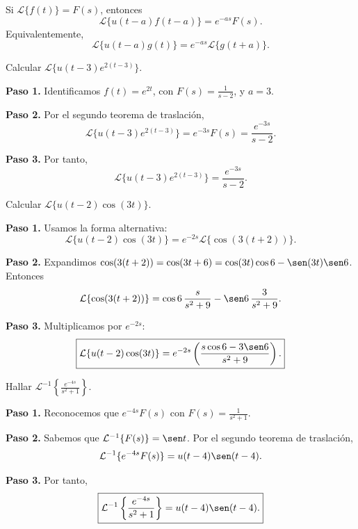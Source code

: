 \begin{theorem}
Si $\mathcal{L}\{f(t)\}=F(s)$, entonces
\[
\mathcal{L}\{u(t-a) f(t-a)\} = e^{-as} F(s).
\]
Equivalentemente,
\[
\mathcal{L}\{u(t-a) g(t)\} = e^{-as} \mathcal{L}\{g(t+a)\}.
\]
\end{theorem}

\begin{example}
Calcular $\mathcal{L}\{u(t-3) e^{2(t-3)}\}$.
\begin{myproof}
\textbf{Paso 1.} Identificamos $f(t)=e^{2t}$, con $F(s)=\frac{1}{s-2}$, y $a=3$.

\textbf{Paso 2.} Por el segundo teorema de traslación,
\[
\mathcal{L}\{u(t-3) e^{2(t-3)}\} = e^{-3s} F(s) = \frac{e^{-3s}}{s-2}.
\]

\textbf{Paso 3.} Por tanto,
\[
\boxed{\mathcal{L}\{u(t-3) e^{2(t-3)}\} = \frac{e^{-3s}}{s-2}.}
\]
\end{myproof}
\end{example}

\begin{example}
Calcular $\mathcal{L}\{u(t-2) \cos(3t)\}$.
\begin{myproof}
\textbf{Paso 1.} Usamos la forma alternativa:
\[
\mathcal{L}\{u(t-2) \cos(3t)\} = e^{-2s} \mathcal{L}\{\cos(3(t+2))\}.
\]

\textbf{Paso 2.} Expandimos $\cos(3(t+2)) = \cos(3t+6) = \cos(3t)\cos 6 - \sen(3t)\sen 6$.
Entonces
\[
\mathcal{L}\{\cos(3(t+2))\} = \cos 6\,\frac{s}{s^2+9} - \sen 6\,\frac{3}{s^2+9}.
\]

\textbf{Paso 3.} Multiplicamos por $e^{-2s}$:
\[
\boxed{\mathcal{L}\{u(t-2) \cos(3t)\} = e^{-2s}\left(\frac{s\cos 6 - 3\sen 6}{s^2+9}\right).}
\]
\end{myproof}
\end{example}

\begin{example}
Hallar $\mathcal{L}^{-1}\left\{\frac{e^{-4s}}{s^2+1}\right\}$.
\begin{myproof}
\textbf{Paso 1.} Reconocemos que $e^{-4s}F(s)$ con $F(s)=\frac{1}{s^2+1}$.

\textbf{Paso 2.} Sabemos que $\mathcal{L}^{-1}\{F(s)\} = \sen t$. Por el segundo teorema de traslación,
\[
\mathcal{L}^{-1}\{e^{-4s}F(s)\} = u(t-4) \sen(t-4).
\]

\textbf{Paso 3.} Por tanto,
\[
\boxed{\mathcal{L}^{-1}\left\{\frac{e^{-4s}}{s^2+1}\right\} = u(t-4)\sen(t-4).}
\]
\end{myproof}
\end{example}

